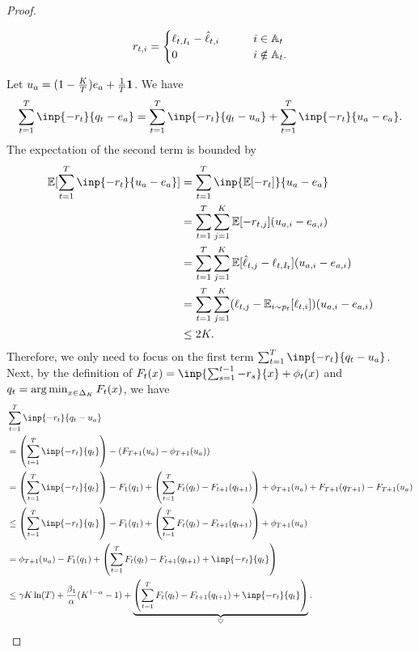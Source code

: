 \begin{proof}
\begin{itemize}
    \begin{align*}
        r_{t,i} = \begin{cases}
            \ell_{t,I_t} - \hat{\ell}_{t,i} &\qquad i \in {\mathbb{A}}_t \\
            0 &\qquad i \notin {\mathbb{A}}_t.
        \end{cases}
    \end{align*}
\end{itemize} 
Let $u_a = (1 - \frac{K}{T})e_a + \frac{1}{T}\bm{1}$. We have
\begin{align*}
    \sum_{t=1}^T \inp{-r_t}{q_t - e_a} = \sum_{t=1}^T \inp{-r_t}{q_t - u_a} + \sum_{t=1}^T \inp{-r_t}{u_a - e_a}.
\end{align*}
The expectation of the second term is bounded by
\begin{align*}
    \E[\sum_{t=1}^T \inp{-r_t}{u_a - e_a}] &= \sum_{t=1}^T \inp{\E[-r_t]}{u_a - e_a} \\
    &= \sum_{t=1}^T \sum_{j=1}^K \E[-r_{t,j}](u_{a,i}- e_{a,i}) \\
    &= \sum_{t=1}^T \sum_{j=1}^K \E[\hat{\ell}_{t,j} - \ell_{t,I_t}](u_{a,i}- e_{a,i}) \\
    &= \sum_{t=1}^T \sum_{j=1}^K (\ell_{t,j} - \E_{i \sim p_t}[\ell_{t,i}])(u_{a,i}- e_{a,i}) \\
    &\leq 2K.
\end{align*}
Therefore, we only need to focus on the first term $\sum_{t=1}^T \inp{-r_t}{q_t - u_a}$.
Next, by the definition of $F_t(x) = \inp{\sum_{s=1}^{t-1}-r_s}{x} + \phi_{t}(x)$ and $q_t = \operatorname*{arg\,min}_{x \in \Delta_K}F_t(x)$, we have 
\begin{align*}
    &\sum_{t=1}^T \inp{-r_t}{q_t - u_a} \\
    &= \left(\sum_{t=1}^T\inp{-r_t}{q_t}\right) - (F_{T+1}(u_a) - \phi_{T+1}(u_a)) \\
    &= \left(\sum_{t=1}^T\inp{-r_t}{q_t}\right) - F_1(q_1) + \left(\sum_{t=1}^T F_t(q_t) - F_{t+1}(q_{t+1}) \right) + \phi_{T+1}(u_a) + F_{T+1}(q_{T+1}) - F_{T+1}(u_a) \\
    &\leq \left(\sum_{t=1}^T\inp{-r_t}{q_t}\right) - F_1(q_1) + \left(\sum_{t=1}^T F_t(q_t) - F_{t+1}(q_{t+1}) \right) + \phi_{T+1}(u_a)  \\
    &= \phi_{T+1}(u_a) - F_1(q_1) + \left( \sum_{t=1}^T F_t(q_t) - F_{t+1}(q_{t+1}) + \inp{-r_t}{q_t} \right) \\
    &\leq \gamma K\ln(T) + \frac{\beta_1}{\alpha}(K^{1-\alpha}-1) + \underbrace{\left( \sum_{t=1}^T F_t(q_t) - F_{t+1}(q_{t+1}) + \inp{-r_t}{q_t} \right)}_{\heartsuit}.

\end{align*}
\end{proof}
